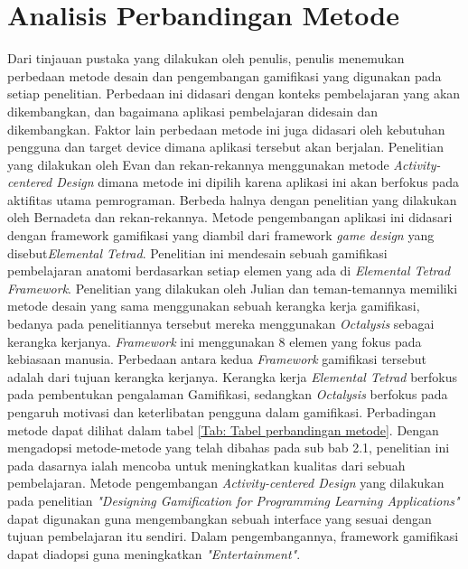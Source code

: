 \section{Analisis Perbandingan Metode}
Dari tinjauan pustaka yang dilakukan oleh penulis, penulis menemukan perbedaan metode desain dan pengembangan gamifikasi yang digunakan pada setiap penelitian.
Perbedaan ini didasari dengan konteks pembelajaran yang akan dikembangkan, dan bagaimana aplikasi pembelajaran didesain dan dikembangkan.
Faktor lain perbedaan metode ini juga didasari oleh kebutuhan pengguna dan target device dimana aplikasi tersebut akan berjalan.
Penelitian yang dilakukan oleh Evan dan rekan-rekannya menggunakan metode \textit{Activity-centered Design} dimana metode ini dipilih karena aplikasi ini akan berfokus pada aktifitas utama pemrograman.
Berbeda halnya dengan penelitian yang dilakukan oleh Bernadeta dan rekan-rekannya. Metode pengembangan aplikasi ini didasari dengan framework gamifikasi yang diambil dari framework \textit{game design} yang disebut\textit{Elemental Tetrad}.
Penelitian ini mendesain sebuah gamifikasi pembelajaran anatomi berdasarkan setiap elemen yang ada di \textit{Elemental Tetrad Framework}.
Penelitian yang dilakukan oleh Julian dan teman-temannya memiliki metode desain yang sama menggunakan sebuah kerangka kerja gamifikasi, 
bedanya  pada penelitiannya tersebut mereka menggunakan \textit{Octalysis} sebagai kerangka kerjanya. \textit{Framework} ini menggunakan 8 elemen yang fokus pada kebiasaan manusia.
Perbedaan antara kedua \textit{Framework} gamifikasi tersebut adalah dari tujuan kerangka kerjanya. Kerangka kerja \textit{Elemental Tetrad} berfokus pada pembentukan pengalaman Gamifikasi,
sedangkan \textit{Octalysis} berfokus pada pengaruh motivasi dan keterlibatan pengguna dalam gamifikasi. Perbadingan metode dapat dilihat dalam tabel \ref*{Tab: Tabel perbandingan metode}.
Dengan mengadopsi metode-metode yang telah dibahas pada sub bab 2.1, penelitian ini pada dasarnya ialah mencoba untuk meningkatkan kualitas dari sebuah pembelajaran.
Metode pengembangan \textit{Activity-centered Design} yang dilakukan pada penelitian \textit{"Designing Gamification for Programming Learning Applications"} dapat digunakan guna mengembangkan sebuah interface yang sesuai dengan tujuan pembelajaran itu sendiri.
Dalam pengembangannya, framework gamifikasi dapat diadopsi guna meningkatkan \textit{"Entertainment"}. 
